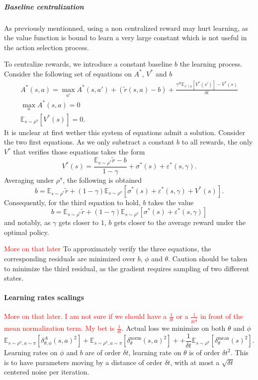 \documentclass[11pt]{article}
\newcommand{\deltat}{{\delta t}}
\newcommand{\E}{\mathbb{E}}
\newcommand{\TODO}[1]{\textcolor{red}{#1}}
\begin{document}
\subparagraph{Baseline centralization}
As previously mentionned, using a non centralized reward may hurt learning, as the
value function is bound to learn a very large constant which is not useful in the
action selection process.

To centralize rewards, we introduce a constant baseline $b$ the learning process.
Consider the following set of equations on $A^*$, $V^*$ and $b$
\begin{gather}
	A^*(s, a) = \max\limits_{a'} A^*(s, a') + 
		(\tilde{r}(s, a) - b)
		 + 
		\frac{\gamma^\deltat \E_{s'\mid a}\left[
			V^*(s')
		\right] - V^*(s)
		}{
		\deltat
	}\\
	\max\limits_{a} A^*(s, a) = 0\\
	\E_{s\sim \rho^\pi}\left[V^*(s)\right] = 0
	.
\end{gather}
It is unclear at first wether this system of equations admit a solution.
Consider the two first equations. As we only substract a constant $b$ to all
rewards, the only $V^*$ that verifies those equations takes the form
\begin{equation}
	V^*(s) = \frac{\E_{s\sim\rho^*}\tilde{r} - b}{1 - \gamma} +
	\sigma^*(s) + \varepsilon^*(s, \gamma).
\end{equation}
Averaging under $\rho^\pi$, the following is obtained
\begin{equation}
	b = \E_{s\sim\rho^*}\tilde{r} +
	(1 - \gamma) \E_{s\sim\rho^\pi}\left[\sigma^*(s) +
		\varepsilon^*(s, \gamma) +
		V^*(s)
	\right].
\end{equation}
Consequently, for the third equation to hold, $b$ takes the value
\begin{equation}
	b = \E_{s\sim\rho^*}\tilde{r} +
	(1 - \gamma) \E_{s\sim\rho^\pi}\left[\sigma^*(s) +
		\varepsilon^*(s, \gamma)
	\right]
\end{equation}
and notably, as $\gamma$ gets closer to $1$, $b$ gets closer to the
average reward under the optimal policy.

\TODO{More on that later}
To approximately verify the three equations, the corresponding residuals are
minimized over $b$, $\phi$ and $\theta$. Caution should be taken to minimize
the third residual, as the gradient requires sampling of two different states.

\paragraph{Learning rates scalings}
\TODO{More on that later. I am not sure if we should have a $\frac{1}{\deltat}$
	or a $\frac{1}{\deltat^\frac{3}{2}}$ in front of the mean normalization
term. My bet is $\frac{1}{\deltat}$}.
Actual loss we minimize on both $\theta$ and $\phi$
\begin{equation}
	\E_{s \sim \rho^\pi, a \sim \pi}\left[\delta^A_{\theta, \phi}(s, a)^2\right] +
	\E_{s \sim \rho^\pi, a \sim \pi}\left[\delta^\text{norm}_{\theta}(s, a)^2\right] +
	+ \frac{1}{\deltat}\E_{s \sim \rho^\pi}\left[\delta^\text{mean}_{\theta}(s)^2\right].
\end{equation}
Learning rates on $\phi$ and $b$ are of order $\deltat$, learning rate on
$\theta$ is of order $\deltat^2$. This is to have parameters moving by a
distance of order $\deltat$, with at most a $\sqrt{\deltat}$ centered noise per
iteration.
\end{document}
